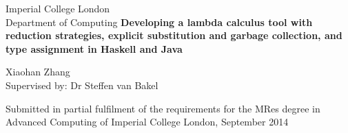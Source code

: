 \begin{titlepage}
\begin{center}
{
  \Large Imperial College London \\
  Department of Computing
  \rm
  \vskip 3in
  \Large \bf Developing a lambda calculus tool with reduction strategies, explicit substitution and garbage collection, and type assignment in Haskell and Java \par
}
\vskip 0.3in
\par
{\Large Xiaohan Zhang\\[14pt]
\large Supervised by: Dr Steffen van Bakel}
\vskip 4in
\par
Submitted in partial fulfilment of the requirements for the MRes degree in 
\\
Advanced Computing of Imperial College London, September 2014
\vfil
\end{center}
\end{titlepage}